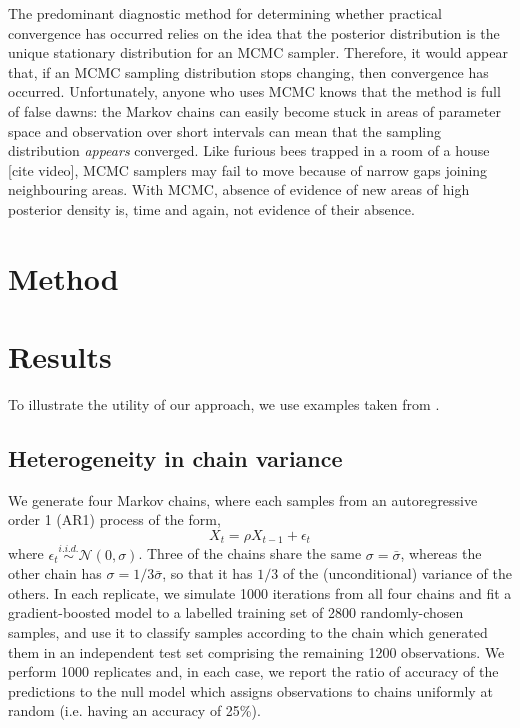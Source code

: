 \documentclass{article}
\begin{document}
The predominant diagnostic method for determining whether practical convergence has occurred relies on the idea that the posterior distribution is the unique stationary distribution for an MCMC sampler. Therefore, it would appear that, if an MCMC sampling distribution stops changing, then convergence has occurred. Unfortunately, anyone who uses MCMC knows that the method is full of false dawns: the Markov chains can easily become stuck in areas of parameter space and observation over short intervals can mean that the sampling distribution \textit{appears} converged. Like furious bees trapped in a room of a house [cite video], MCMC samplers may fail to move because of narrow gaps joining neighbouring areas. With MCMC, absence of evidence of new areas of high posterior density is, time and again, not evidence of their absence.

\section{Method}

\section{Results}
To illustrate the utility of our approach, we use examples taken from \cite{vehtari2019rank}.

\subsection{Heterogeneity in chain variance}\label{sec:heterogeneity}
We generate four Markov chains, where each samples from an autoregressive order 1 (AR1) process of the form,
%
\begin{equation}
X_t = \rho X_{t-1} + \epsilon_t
\end{equation}
%
where $\epsilon_t\stackrel{i.i.d.}{\sim}\mathcal{N}(0, \sigma)$. Three of the chains share the same $\sigma=\bar{\sigma}$, whereas the other chain has $\sigma=1/3\bar{\sigma}$, so that it has $1/3$ of the (unconditional) variance of the others. In each replicate, we simulate 1000 iterations from all four chains and fit a gradient-boosted model to a labelled training set of 2800 randomly-chosen samples, and use it to classify samples according to the chain which generated them in an independent test set comprising the remaining 1200 observations. We perform 1000 replicates and, in each case, we report the ratio of accuracy of the predictions to the null model which assigns observations to chains uniformly at random (i.e. having an accuracy of 25\%).
\end{document}
